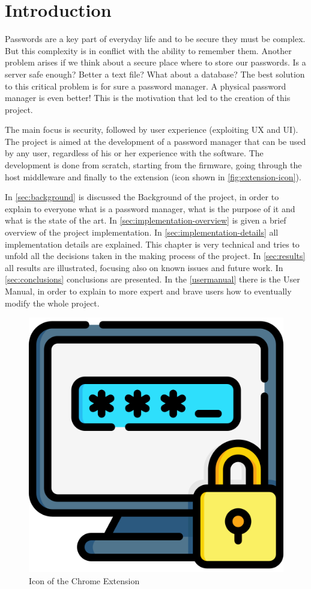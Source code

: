\chapter{Introduction}
Passwords are a key part of everyday life and to be secure they must be complex. But this complexity is in conflict with the ability to remember them. Another problem arises if we think about a secure place where to store our passwords. Is a server safe enough? Better a text file? What about a database?
The best solution to this critical problem is for sure a password manager. A physical password manager is even better! This is the motivation that led to the creation of this project.

The main focus is security, followed by user experience (exploiting UX and UI). The project is aimed at the development of a password manager that can be used by any user, regardless of his or her experience with the software. The development is done from scratch, starting from the firmware, going through the host middleware and finally to the extension (icon shown in \autoref{fig:extension-icon}).

In \autoref{sec:background} is discussed the Background of the project, in order to explain to everyone what is a password manager, what is the purpose of it and what is the state of the art. In \autoref{sec:implementation-overview} is given a brief overview of the project implementation. In \autoref{sec:implementation-details} all implementation details are explained. This chapter is very technical and tries to unfold all the decisions taken in the making process of the project.
In \autoref{sec:results} all results are illustrated, focusing also on known issues and future work. In \autoref{sec:conclusions} conclusions are presented. In the \autoref{usermanual} there is the User Manual, in order to explain to more expert and brave users how to eventually modify the whole project.

\vspace*{1cm}
\begin{figure}[H]
	\centering
	\includegraphics[width=0.27\linewidth]{images/extension/password.png}
	\caption{Icon of the Chrome Extension}
	\label{fig:extension-icon}
\end{figure}